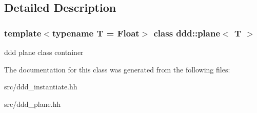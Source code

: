 \subsection{Detailed Description}
\subsubsection*{template$<$typename T = Float$>$\newline
class ddd\+::plane$<$ T $>$}

ddd plane class container 

The documentation for this class was generated from the following files\+:\begin{DoxyCompactItemize}
\item 
src/ddd\+\_\+instantiate.\+hh\item 
src/ddd\+\_\+plane.\+hh\end{DoxyCompactItemize}
